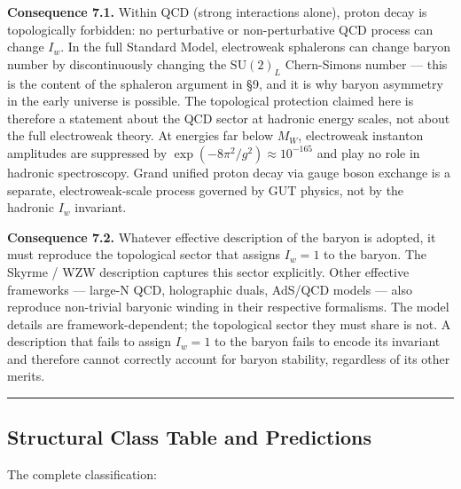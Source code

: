 \documentclass[12pt,a4paper]{article}
\begin{document}
\textbf{Consequence 7.1.} Within QCD (strong interactions alone), proton
decay is topologically forbidden: no perturbative or non-perturbative
QCD process can change \(I_w\). In the full Standard Model, electroweak
sphalerons can change baryon number by discontinuously changing the
\(\mathrm{SU}(2)_L\) Chern-Simons number --- this is the content of the
sphaleron argument in §9, and it is why baryon asymmetry in the early
universe is possible. The topological protection claimed here is
therefore a statement about the QCD sector at hadronic energy scales,
not about the full electroweak theory. At energies far below \(M_W\),
electroweak instanton amplitudes are suppressed by
\(\exp(-8\pi^2/g^2) \approx 10^{-165}\) and play no role in hadronic
spectroscopy. Grand unified proton decay via gauge boson exchange is a
separate, electroweak-scale process governed by GUT physics, not by the
hadronic \(I_w\) invariant.

\textbf{Consequence 7.2.} Whatever effective description of the baryon
is adopted, it must reproduce the topological sector that assigns
\(I_w = 1\) to the baryon. The Skyrme / WZW description captures this
sector explicitly. Other effective frameworks --- large-N QCD,
holographic duals, AdS/QCD models --- also reproduce non-trivial
baryonic winding in their respective formalisms. The model details are
framework-dependent; the topological sector they must share is not. A
description that fails to assign \(I_w = 1\) to the baryon fails to
encode its invariant and therefore cannot correctly account
for baryon stability, regardless of its other merits.

\begin{center}\rule{0.5\linewidth}{0.5pt}\end{center}

\hypertarget{structural-class-table-and-predictions}{%
\subsection{Structural Class Table and
Predictions}\label{structural-class-table-and-predictions}}

The complete classification:
\end{document}
